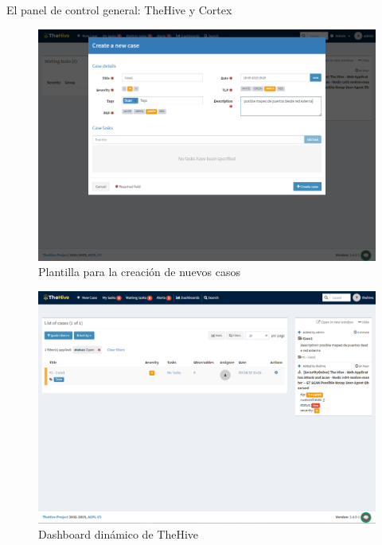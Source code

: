 \begin{section}{El panel de control general: TheHive y Cortex}
        \begin{figure}[H]
        \centering
        \includegraphics[width=1\textwidth]{./iteracion_1_imagenes/figura_24_plantilla_creacion_casos.png}
        \caption{Plantilla para la creación de nuevos casos}
        \label{fig:figura_24_plantilla_nuevos_casos}
     \end{figure}
     \begin{figure}[H]
        \centering
        \includegraphics[width=1\textwidth]{./iteracion_1_imagenes/figura_25_dashboard_dinamico_thehive.png}
        \caption{Dashboard dinámico de TheHive}
        \label{fig:dashboard_dinamico}
     \end{figure}
     \FloatBarrier

\end{section}
